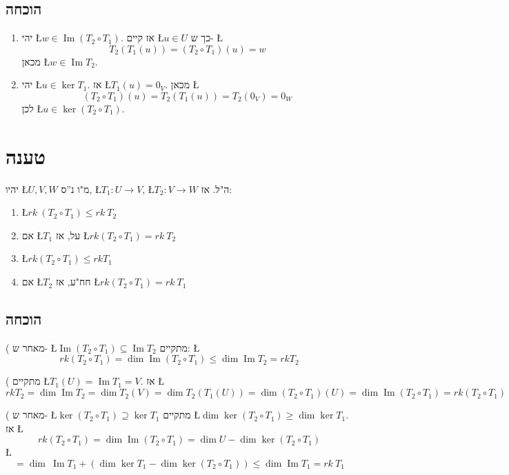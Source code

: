 \documentclass[english,hebrew]{article}
\begin{document}
\subsection{הוכחה}
\begin{enumerate}
\item יהי \L{$w\in\operatorname{Im}(T_{2}\circ T_{1})$}. אז קיים \L{$u\in U$}
כך ש- \L{%
\[
T_{2}(T_{1}(u))=(T_{2}\circ T_{1})(u)=w
\]
}%
מכאן \L{$w\in\operatorname{Im}T_{2}$}.
\item יהי \L{$u\in\ker T_{1}$}. אז \L{$T_{1}(u)=0_{V}$}. מכאן \L{%
\[
(T_{2}\circ T_{1})(u)=T_{2}(T_{1}(u))=T_{2}(0_{V})=0_{W}
\]
}%
לכן \L{$u\in\ker(T_{2}\circ T_{1})$}. 
\end{enumerate}

\section{טענה}

יהיו \L{$U,V,W$} מ"ו נ\textquotedblright ס, \L{$T_{1}:U\to V$},
\L{$T_{2}:V\to W$} ה"ל. אז: 
\begin{enumerate}
\item \L{$rk\ (T_{2}\circ T_{1})\le rk\ T_{2}$} 
\item אם \L{$T_{1}$} על, אז \L{$rk(T_{2}\circ T_{1})=rk\ T_{2}$} 
\item \L{$rk(T_{2}\circ T_{1})\le rkT_{1}$} 
\item אם \L{$T_{2}$} חח"ע, אז \L{$rk(T_{2}\circ T_{1})=rk\ T_{1}$} 
\end{enumerate}

\subsection{הוכחה}

{\endL}( מאחר ש- \L{$\operatorname{Im}(T_{2}\circ T_{1})\subseteq\operatorname{Im}T_{2}$}
מתקיים: \L{%
\[
rk(T_{2}\circ T_{1})=\dim\operatorname{Im}(T_{2}\circ T_{1})\le\dim\operatorname{Im}T_{2}=rkT_{2}
\]
}%

{\endL}( מתקיים \L{$T_{1}(U)=\operatorname{Im}T_{1}=V$}.
אז \L{%
\[
rkT_{2}=\dim\operatorname{Im}T_{2}=\dim T_{2}(V)=\dim T_{2}(T_{1}(U))=\dim(T_{2}\circ T_{1})(U)=\dim\operatorname{Im}(T_{2}\circ T_{1})=rk(T_{2}\circ T_{1})
\]
}%

{\endL}( מאחר ש- \L{$\ker(T_{2}\circ T_{1})\supseteq\ker T_{1}$}
מתקיים \L{$\dim\ker(T_{2}\circ T_{1})\ge\dim\ker T_{1}$}. אז \L{%
\[
rk(T_{2}\circ T_{1})=\dim\operatorname{Im}(T_{2}\circ T_{1})=\dim U-\dim\ker(T_{2}\circ T_{1})
\]
}%
\L{%
\[
=\dim\ \operatorname{Im}T_{1}+\left(\dim\ker T_{1}-\dim\ker(T_{2}\circ T_{1})\right)\le\dim\operatorname{Im}T_{1}=rk\ T_{1}
\]
}%
\end{document}
